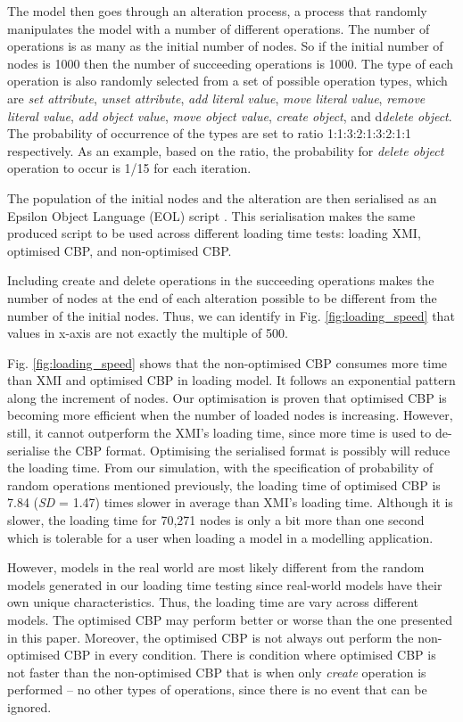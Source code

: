 \documentclass[sigconf]{acmart}
\begin{document}
The model then goes through an alteration process, a process that randomly manipulates the model with a number of different operations. The number of operations is as many as the initial number of nodes. So if the initial number of nodes is 1000 then the number of succeeding operations is 1000. The type of each operation is also randomly selected from a set of possible operation types, which are \emph{set attribute}, \emph{unset attribute}, \emph{add literal value}, \emph{move literal value}, \emph{remove literal value}, \emph{add object value}, \emph{move object value}, \emph{create object}, and d\emph{delete object}. The probability of occurrence of the types are set to ratio 1:1:3:2:1:3:2:1:1 respectively. As an example, based on the ratio, the probability for \emph{delete object} operation to occur is 1/15 for each iteration. 

The population of the initial nodes and the alteration are then serialised as an Epsilon Object Language (EOL) script \cite{kolovos2006epsilon}. This serialisation makes the same produced script to be used across different loading time tests: loading XMI, optimised CBP, and non-optimised CBP. 

Including create and delete operations in the succeeding operations makes the number of nodes at the end of each alteration possible to be different from the number of the initial nodes. Thus, we can identify in Fig. \ref{fig:loading_speed} that values in x-axis are not exactly the multiple of 500.    

Fig. \ref{fig:loading_speed} shows that the non-optimised CBP consumes more time than XMI and optimised CBP in loading model. It follows an exponential pattern along the increment of nodes. Our optimisation is proven that optimised CBP is becoming more efficient when the number of loaded nodes is increasing. However, still, it cannot outperform the XMI's loading time, since more time is used to de-serialise the CBP format. Optimising the serialised format is possibly will reduce the loading time. From our simulation, with the specification of probability of random operations mentioned previously, the loading time of optimised CBP is 7.84 (\textit{SD} = 1.47) times slower in average than XMI's loading time. Although it is slower, the loading time for 70,271 nodes is only a bit more than one second which is tolerable for a user when loading a model in a modelling application. 

However, models in the real world are most likely different from the random models generated in our loading time testing since real-world models have their own unique characteristics. Thus, the loading time are vary across different models. The optimised CBP may perform better or worse than the one presented in this paper. Moreover, the optimised CBP is not always out perform the non-optimised CBP in every condition. There is condition where optimised CBP is not faster than the non-optimised CBP that is when only \emph{create} operation is performed -- no other types of operations, since there is no event that can be ignored. 
\end{document}
